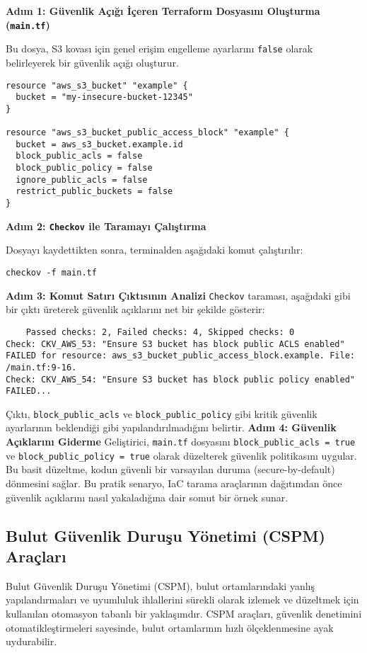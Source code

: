 \textbf{Adım 1: Güvenlik Açığı İçeren Terraform Dosyasını Oluşturma (\texttt{main.tf})}

Bu dosya, S3 kovası için genel erişim engelleme ayarlarını \texttt{false} olarak belirleyerek bir güvenlik açığı oluşturur.

\begin{verbatim}
resource "aws_s3_bucket" "example" {
  bucket = "my-insecure-bucket-12345"
}

resource "aws_s3_bucket_public_access_block" "example" {
  bucket = aws_s3_bucket.example.id
  block_public_acls = false
  block_public_policy = false
  ignore_public_acls = false
  restrict_public_buckets = false
}
\end{verbatim}

\textbf{Adım 2: \texttt{Checkov} ile Taramayı Çalıştırma}

Dosyayı kaydettikten sonra, terminalden aşağıdaki komut çalıştırılır:

\begin{verbatim}
checkov -f main.tf
\end{verbatim}
\textbf{Adım 3: Komut Satırı Çıktısının Analizi}
\texttt{Checkov} taraması, aşağıdaki gibi bir çıktı üreterek güvenlik açıklarını net bir şekilde gösterir:
\begin{verbatim}    Passed checks: 2, Failed checks: 4, Skipped checks: 0
Check: CKV_AWS_53: "Ensure S3 bucket has block public ACLS enabled" FAILED for resource: aws_s3_bucket_public_access_block.example. File: /main.tf:9-16.
Check: CKV_AWS_54: "Ensure S3 bucket has block public policy enabled" FAILED...
\end{verbatim}
Çıktı, \texttt{block\_public\_acls} ve \texttt{block\_public\_policy} gibi kritik güvenlik ayarlarının beklendiği gibi yapılandırılmadığını belirtir.
\textbf{Adım 4: Güvenlik Açıklarını Giderme}
Geliştirici, \texttt{main.tf} dosyasını \texttt{block\_public\_acls = true} ve \texttt{block\_public\_policy = true} olarak düzelterek güvenlik politikasını uygular. Bu basit düzeltme, kodun güvenli bir varsayılan duruma (secure-by-default) dönmesini sağlar. Bu pratik senaryo, IaC tarama araçlarının dağıtımdan önce güvenlik açıklarını nasıl yakaladığına dair somut bir örnek sunar.

\subsection{Bulut Güvenlik Duruşu Yönetimi (CSPM) Araçları}

Bulut Güvenlik Duruşu Yönetimi (CSPM), bulut ortamlarındaki yanlış yapılandırmaları ve uyumluluk ihlallerini sürekli olarak izlemek ve düzeltmek için kullanılan otomasyon tabanlı bir yaklaşımdır. CSPM araçları, güvenlik denetimini otomatikleştirmeleri sayesinde, bulut ortamlarının hızlı ölçeklenmesine ayak uydurabilir.

